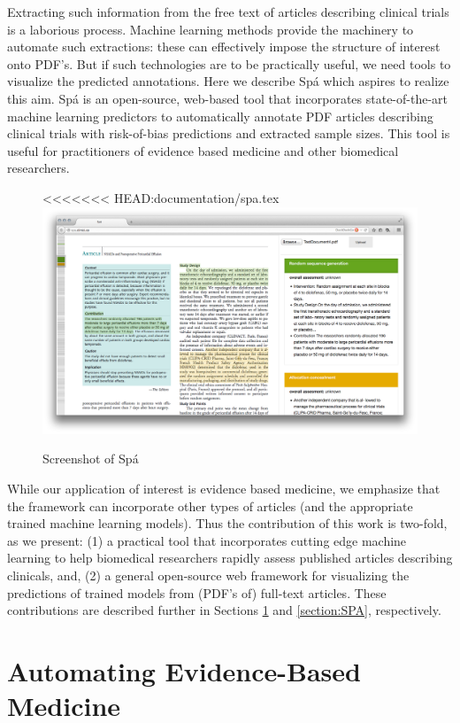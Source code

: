 \documentclass[runningheads,a4paper]{llncs}
\begin{document}
Extracting such information from the free text of articles describing clinical trials is a laborious process. Machine learning methods provide the machinery to automate such extractions: these can effectively impose the structure of interest onto PDF's. But if such technologies are to be practically useful, we need tools to visualize the predicted annotations. Here we describe {Sp\'a} which aspires to realize this aim. {Sp\'a} is an open-source, web-based tool that incorporates state-of-the-art machine learning predictors to automatically annotate PDF articles describing clinical trials with risk-of-bias predictions and extracted sample sizes. This tool is useful for practitioners of evidence based medicine and other biomedical researchers. 

\begin{figure}[htb]
\centering
<<<<<<< HEAD:documentation/spa.tex
\includegraphics[width=.9\linewidth]{./screenshot.png}
\caption{Screenshot of Sp{\'a}}
\end{figure}

While our application of interest is evidence based medicine, we emphasize that the framework can incorporate other types of articles (and the appropriate trained machine learning models). Thus the contribution of this work is two-fold, as we present: (1) a practical tool that incorporates cutting edge machine learning to help biomedical researchers rapidly assess published articles describing clinicals, and, (2) a general open-source web framework for visualizing the predictions of trained models from (PDF's of) full-text articles. These contributions are described further in Sections \ref{section:EBM-ML} and \ref{section:SPA}, respectively.

\section{Automating Evidence-Based Medicine}
\label{section:EBM-ML}
\end{document}
